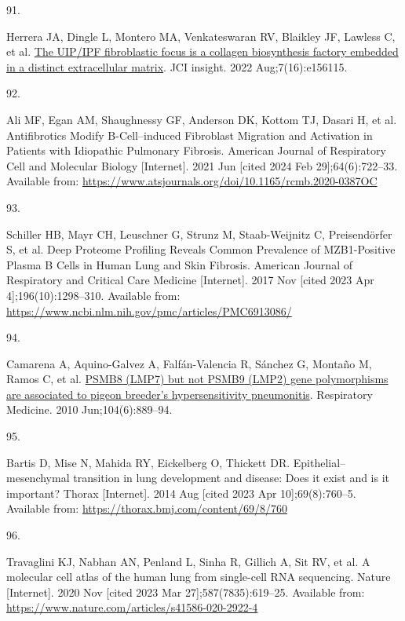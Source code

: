 \documentclass[
]{article}
\newlength{\cslhangindent}
\newlength{\csllabelwidth}
\newenvironment{CSLReferences}[2] %
 {\begin{list}{}{%
  \setlength{\itemindent}{0pt}
  \setlength{\leftmargin}{0pt}
  \setlength{\parsep}{0pt}
  \ifodd #1
   \setlength{\leftmargin}{\cslhangindent}
   \setlength{\itemindent}{-1\cslhangindent}
  \fi
  \setlength{\itemsep}{#2\baselineskip}}}
 {\end{list}}
\newcommand{\CSLLeftMargin}[1]{\parbox[t]{\csllabelwidth}{\strut#1\strut}}
\newcommand{\CSLRightInline}[1]{\parbox[t]{\linewidth - \csllabelwidth}{\strut#1\strut}}
\begin{document}
\begin{CSLReferences}{0}{1}
\CSLLeftMargin{91. }%
\CSLRightInline{Herrera JA, Dingle L, Montero MA, Venkateswaran RV, Blaikley JF, Lawless C, et al. \href{https://doi.org/10.1172/jci.insight.156115}{The {UIP}/{IPF} fibroblastic focus is a collagen biosynthesis factory embedded in a distinct extracellular matrix}. JCI insight. 2022 Aug;7(16):e156115. }

\CSLLeftMargin{92. }%
\CSLRightInline{Ali MF, Egan AM, Shaughnessy GF, Anderson DK, Kottom TJ, Dasari H, et al. Antifibrotics {Modify} {B}-{Cell}--induced {Fibroblast} {Migration} and {Activation} in {Patients} with {Idiopathic} {Pulmonary} {Fibrosis}. American Journal of Respiratory Cell and Molecular Biology {[}Internet{]}. 2021 Jun {[}cited 2024 Feb 29{]};64(6):722--33. Available from: \url{https://www.atsjournals.org/doi/10.1165/rcmb.2020-0387OC}}

\CSLLeftMargin{93. }%
\CSLRightInline{Schiller HB, Mayr CH, Leuschner G, Strunz M, Staab-Weijnitz C, Preisendörfer S, et al. Deep {Proteome} {Profiling} {Reveals} {Common} {Prevalence} of {MZB1}-{Positive} {Plasma} {B} {Cells} in {Human} {Lung} and {Skin} {Fibrosis}. American Journal of Respiratory and Critical Care Medicine {[}Internet{]}. 2017 Nov {[}cited 2023 Apr 4{]};196(10):1298--310. Available from: \url{https://www.ncbi.nlm.nih.gov/pmc/articles/PMC6913086/}}

\CSLLeftMargin{94. }%
\CSLRightInline{Camarena A, Aquino-Galvez A, Falfán-Valencia R, Sánchez G, Montaño M, Ramos C, et al. \href{https://doi.org/10.1016/j.rmed.2010.01.014}{{PSMB8} ({LMP7}) but not {PSMB9} ({LMP2}) gene polymorphisms are associated to pigeon breeder's hypersensitivity pneumonitis}. Respiratory Medicine. 2010 Jun;104(6):889--94. }

\CSLLeftMargin{95. }%
\CSLRightInline{Bartis D, Mise N, Mahida RY, Eickelberg O, Thickett DR. Epithelial--mesenchymal transition in lung development and disease: Does it exist and is it important? Thorax {[}Internet{]}. 2014 Aug {[}cited 2023 Apr 10{]};69(8):760--5. Available from: \url{https://thorax.bmj.com/content/69/8/760}}

\CSLLeftMargin{96. }%
\CSLRightInline{Travaglini KJ, Nabhan AN, Penland L, Sinha R, Gillich A, Sit RV, et al. A molecular cell atlas of the human lung from single-cell {RNA} sequencing. Nature {[}Internet{]}. 2020 Nov {[}cited 2023 Mar 27{]};587(7835):619--25. Available from: \url{https://www.nature.com/articles/s41586-020-2922-4}}


\end{CSLReferences}
\end{document}
